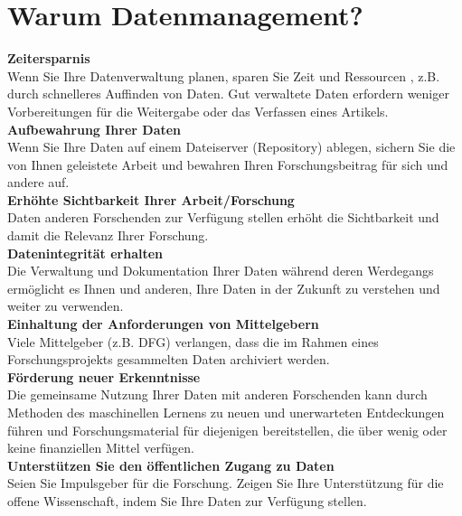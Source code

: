 \section{Warum Datenmanagement?}

\textbf{Zeitersparnis} \\
Wenn Sie Ihre Datenverwaltung planen, sparen Sie Zeit und Ressourcen \cite{martinez-garcia:2023:Heliyon}, z.B.
durch schnelleres Auffinden von Daten. Gut verwaltete Daten erfordern weniger
Vorbereitungen für die Weitergabe oder das Verfassen eines Artikels. \\[6pt]
%
\textbf{Aufbewahrung Ihrer Daten} \\
Wenn Sie Ihre Daten auf einem Dateiserver (Repository) ablegen, sichern Sie
die von Ihnen geleistete Arbeit und bewahren Ihren Forschungsbeitrag für
sich und andere auf. \\[6pt]
%
\textbf{Erhöhte Sichtbarkeit Ihrer Arbeit/Forschung} \\
Daten anderen Forschenden zur Verfügung stellen erhöht die Sichtbarkeit und damit die Relevanz Ihrer Forschung. \\[6pt]
%
\textbf{Datenintegrität erhalten} \\
Die Verwaltung und Dokumentation Ihrer Daten während deren Werdegangs
ermöglicht es Ihnen und anderen, Ihre Daten in der Zukunft zu verstehen und
weiter zu verwenden.\\[6pt]
%
\textbf{Einhaltung der Anforderungen von Mittelgebern} \\
Viele Mittelgeber (z.B. DFG) verlangen, dass die im Rahmen eines
Forschungsprojekts gesammelten Daten archiviert werden.\\[6pt]
%
\textbf{Förderung neuer Erkenntnisse} \\
Die gemeinsame Nutzung Ihrer Daten mit anderen Forschenden kann durch
Methoden des maschinellen Lernens zu neuen und unerwarteten Entdeckungen führen
und Forschungsmaterial für diejenigen bereitstellen, die über wenig oder keine
finanziellen Mittel verfügen. \\[6pt]
%
\textbf{Unterstützen Sie den öffentlichen Zugang zu Daten} \\
Seien Sie Impulsgeber für die Forschung. Zeigen Sie Ihre Unterstützung für die
offene Wissenschaft, indem Sie Ihre Daten zur Verfügung stellen.
